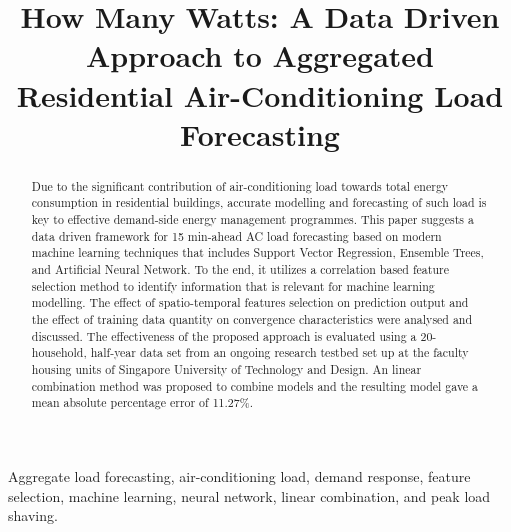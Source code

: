 \documentclass[conference]{IEEEtran}
\begin{document}
\title{How Many Watts: A Data Driven Approach to Aggregated Residential Air-Conditioning Load Forecasting}

\author{

}
\maketitle


\begin{abstract}
Due to the significant contribution of air-conditioning load towards total energy consumption in residential buildings, accurate modelling and forecasting of such load is key to effective demand-side energy management programmes. This paper suggests a data driven framework for 15 min-ahead AC load forecasting based on modern machine learning techniques that includes Support Vector Regression, Ensemble Trees, and Artificial Neural Network. To the end, it utilizes a correlation based feature selection method to identify information that is relevant for machine learning modelling. The effect of spatio-temporal features selection on prediction output and the effect of training data quantity on convergence characteristics were analysed and discussed. The effectiveness of the proposed approach is evaluated using a 20-household, half-year data set from an ongoing research testbed set up at the faculty housing units of Singapore University of Technology and Design. An linear combination method was proposed to combine models and the resulting model gave a mean absolute percentage error of 11.27\%. %
\\
\end{abstract}
\begin{IEEEkeywords}
	Aggregate load forecasting, air-conditioning load, demand response, feature selection, machine learning, neural network, linear combination, and peak load shaving.
\end{IEEEkeywords}
\end{document}
